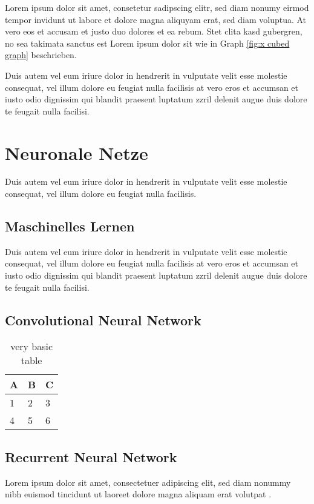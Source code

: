 Lorem ipsum dolor sit amet, consetetur sadipscing elitr, sed diam nonumy eirmod tempor invidunt ut labore et dolore magna aliquyam erat, sed diam voluptua. At vero eos et accusam et justo duo dolores et ea rebum. Stet clita kasd gubergren, no sea takimata sanctus est Lorem ipsum dolor sit wie in Graph \ref{fig:x cubed graph} beschrieben.

Duis autem vel eum iriure dolor in hendrerit in vulputate velit esse molestie consequat, vel illum dolore eu feugiat nulla facilisis at vero eros et accumsan et iusto odio dignissim qui blandit praesent luptatum zzril delenit augue duis dolore te feugait nulla facilisi.   


\section{Neuronale Netze}
\label{grundlagen_nn}

Duis autem vel eum iriure dolor in hendrerit in vulputate velit esse molestie consequat, vel illum dolore eu feugiat nulla facilisis.


\subsection{Maschinelles Lernen}
\label{grundlagen_nn_ml}

Duis autem vel eum iriure dolor in hendrerit in vulputate velit esse molestie consequat, vel illum dolore eu feugiat nulla facilisis at vero eros et accumsan et iusto odio dignissim qui blandit praesent luptatum zzril delenit augue duis dolore te feugait nulla facilisi. 


\subsection{Convolutional Neural Network}
\label{grundlagen_nn_cnn}


\begin{table}[h]
\centering
\begin{tabular}{l | l | l}
A & B & C \\
\hline
1 & 2 & 3 \\
4 & 5 & 6
\end{tabular}
\caption{very basic table}
\label{tab:abc}
\end{table}


\subsection{Recurrent Neural Network}
\label{grundlagen_nn_rnn}

Lorem ipsum dolor sit amet, consectetuer adipiscing elit, sed diam nonummy nibh euismod tincidunt ut laoreet dolore magna aliquam erat volutpat \cite{latexcompanion}. 

